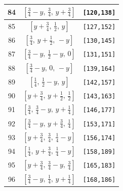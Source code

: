 \documentclass[fleqn,8pt]{jsarticle}
\begin{document}
\begin{longtable}{ccc}
84 & $\left[ \frac{3}{4} - y,\, \frac{3}{4},\, y + \frac{3}{4} \right]$ & {\tt [120,138]} \\ \hline
85 & $\left[ y + \frac{3}{4},\, \frac{1}{2},\, y \right]$ & {\tt [127,152]} \\ \hline
86 & $\left[ \frac{3}{4},\, y + \frac{1}{2},\, - y \right]$ & {\tt [130,145]} \\ \hline
87 & $\left[ \frac{3}{4} - y,\, \frac{1}{2} - y,\, 0 \right]$ & {\tt [131,151]} \\ \hline
88 & $\left[ \frac{3}{4} - y,\, 0,\, - y \right]$ & {\tt [139,164]} \\ \hline
89 & $\left[ \frac{1}{4},\, \frac{1}{2} - y,\, y \right]$ & {\tt [142,157]} \\ \hline
90 & $\left[ y + \frac{3}{4},\, y + \frac{1}{2},\, \frac{1}{2} \right]$ & {\tt [143,163]} \\ \hline
91 & $\left[ \frac{3}{4},\, \frac{3}{4} - y,\, y + \frac{1}{4} \right]$ & {\tt [146,177]} \\ \hline
92 & $\left[ \frac{3}{4} - y,\, y + \frac{3}{4},\, \frac{1}{4} \right]$ & {\tt [153,171]} \\ \hline
93 & $\left[ y + \frac{3}{4},\, \frac{3}{4},\, \frac{1}{4} - y \right]$ & {\tt [156,174]} \\ \hline
94 & $\left[ \frac{1}{4},\, y + \frac{3}{4},\, \frac{1}{4} - y \right]$ & {\tt [158,189]} \\ \hline
95 & $\left[ y + \frac{3}{4},\, \frac{3}{4} - y,\, \frac{3}{4} \right]$ & {\tt [165,183]} \\ \hline
96 & $\left[ \frac{3}{4} - y,\, \frac{1}{4},\, y + \frac{1}{4} \right]$ & {\tt [168,186]} \\
\end{longtable}
\renewcommand{\arraystretch}{1.2}
\end{document}
